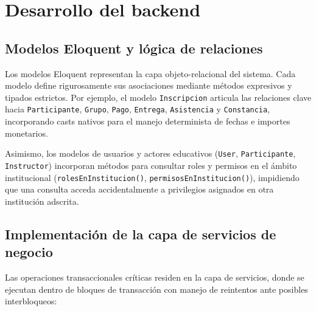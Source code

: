 \section{Desarrollo del backend}
\label{sec:desarrollo_backend}

\subsection{Modelos Eloquent y lógica de relaciones}
\label{sec:modelos_eloquent}

Los modelos Eloquent representan la capa objeto-relacional del sistema. Cada modelo define rigurosamente sus asociaciones mediante métodos expresivos y tipados estrictos. Por ejemplo, el modelo \texttt{Inscripcion} articula las relaciones clave hacia \texttt{Participante}, \texttt{Grupo}, \texttt{Pago}, \texttt{Entrega}, \texttt{Asistencia} y \texttt{Constancia}, incorporando casts nativos para el manejo determinista de fechas e importes monetarios.

Asimismo, los modelos de usuarios y actores educativos (\texttt{User}, \texttt{Participante}, \texttt{Instructor}) incorporan métodos para consultar roles y permisos en el ámbito institucional (\texttt{rolesEnInstitucion()}, \texttt{permisosEnInstitucion()}), impidiendo que una consulta acceda accidentalmente a privilegios asignados en otra institución adscrita.

\subsection{Implementación de la capa de servicios de negocio}
\label{sec:servicios_negocio}

Las operaciones transaccionales críticas residen en la capa de servicios, donde se ejecutan dentro de bloques de transacción con manejo de reintentos ante posibles interbloqueos:

